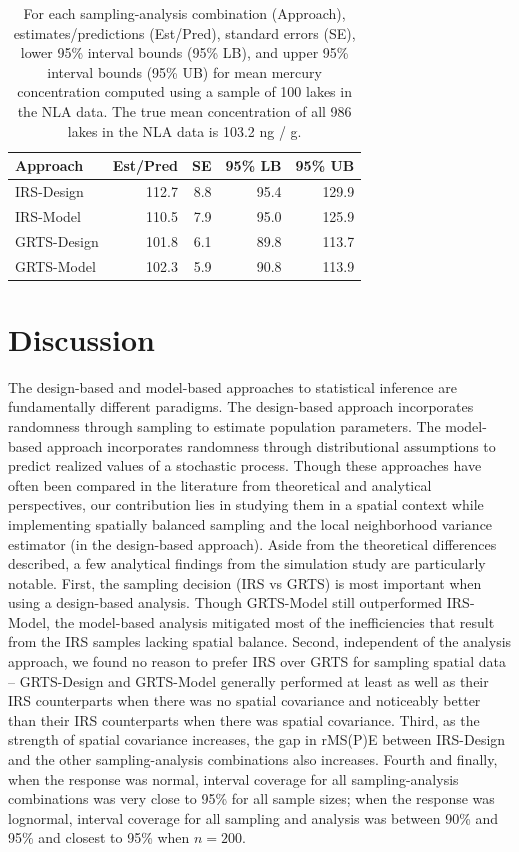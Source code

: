 \documentclass[]{elsarticle} %
\begin{document}
\begin{table}[ht]
\centering
\begin{tabular}{lrrrr}
  \hline
Approach & Est/Pred & SE & 95\% LB & 95\% UB \\ 
  \hline
IRS-Design & 112.7 & 8.8 & 95.4 & 129.9 \\ 
  IRS-Model & 110.5 & 7.9 & 95.0 & 125.9 \\ 
  GRTS-Design & 101.8 & 6.1 & 89.8 & 113.7 \\ 
  GRTS-Model & 102.3 & 5.9 & 90.8 & 113.9 \\ 
   \hline
\end{tabular}
\caption{\label{tab:appliedtab} For each sampling-analysis combination (Approach), estimates/predictions (Est/Pred), standard errors (SE), lower 95\% interval bounds (95\% LB), and upper 95\% interval bounds (95\% UB) for mean mercury concentration computed using a sample of 100 lakes in the NLA data. The true mean concentration of all 986 lakes in the NLA data is 103.2 ng / g.} 
\end{table}

\hypertarget{sec:discussion}{%
\section{Discussion}\label{sec:discussion}}

The design-based and model-based approaches to statistical inference are
fundamentally different paradigms. The design-based approach
incorporates randomness through sampling to estimate population
parameters. The model-based approach incorporates randomness through
distributional assumptions to predict realized values of a stochastic
process. Though these approaches have often been compared in the
literature from theoretical and analytical perspectives, our
contribution lies in studying them in a spatial context while
implementing spatially balanced sampling and the local neighborhood
variance estimator (in the design-based approach). Aside from the
theoretical differences described, a few analytical findings from the
simulation study are particularly notable. First, the sampling decision
(IRS vs GRTS) is most important when using a design-based analysis.
Though GRTS-Model still outperformed IRS-Model, the model-based analysis
mitigated most of the inefficiencies that result from the IRS samples
lacking spatial balance. Second, independent of the analysis approach,
we found no reason to prefer IRS over GRTS for sampling spatial data --
GRTS-Design and GRTS-Model generally performed at least as well as their
IRS counterparts when there was no spatial covariance and noticeably
better than their IRS counterparts when there was spatial covariance.
Third, as the strength of spatial covariance increases, the gap in
rMS(P)E between IRS-Design and the other sampling-analysis combinations
also increases. Fourth and finally, when the response was normal,
interval coverage for all sampling-analysis combinations was very close
to 95\% for all sample sizes; when the response was lognormal, interval
coverage for all sampling and analysis was between 90\% and 95\% and
closest to 95\% when \(n = 200\).
\end{document}

